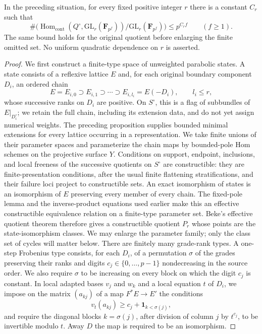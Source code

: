 \begin{theorem}
\label{D:tame-parabolic-fixed-rank-growth}
In the preceding situation, for every fixed positive integer $r$ there is a constant $C_r$ such that
\[\#\bigl(\operatorname{Hom}_{\mathrm{cont}}(Q^\circ,\mathrm{GL}_r(\mathbf F_{p^f}))/\mathrm{GL}_r(\mathbf F_{p^f})\bigr)\le p^{C_r f}\qquad(f\ge1).\]
The same bound holds for the original quotient before enlarging the finite omitted set. No uniform quadratic dependence on $r$ is asserted.
\end{theorem}
\begin{proof}
We first construct a finite-type space of unweighted parabolic states. A state consists of a reflexive lattice $E$ and, for each original boundary component $D_i$, an ordered chain
\[E=E_{i,0}\supset E_{i,1}\supset\cdots\supset E_{i,l_i}=E(-D_i),\qquad l_i\le r,\]
whose successive ranks on $D_i$ are positive. On $S^\circ$, this is a flag of subbundles of $E|_{D_i^\circ}$; we retain the full chain, including its extension data, and do not yet assign numerical weights.
The preceding proposition supplies bounded minimal extensions for every lattice occurring in a representation. We take finite unions of their parameter spaces and parameterize the chain maps by bounded-pole Hom schemes on the projective surface $Y$. Conditions on support, endpoint, inclusions, and local freeness of the successive quotients on $S^\circ$ are constructible: they are finite-presentation conditions, after the usual finite flattening stratifications, and their failure loci project to constructible sets. An exact isomorphism of states is an isomorphism of $E$ preserving every member of every chain. The fixed-pole lemma and the inverse-product equations used earlier make this an effective constructible equivalence relation on a finite-type parameter set. Beke's effective quotient theorem \citep[Theorem~2; proof via Proposition~3.1]{Beke2011FixedRankB} therefore gives a constructible quotient $P_r$ whose points are the state-isomorphism classes. We may enlarge the parameter family; only the class set of cycles will matter below.
There are finitely many grade-rank types. A one-step Frobenius type consists, for each $D_i$, of a permutation $\sigma$ of the grades preserving their ranks and digits $c_j\in\{0,\ldots,p-1\}$ nondecreasing in the source order. We also require $\sigma$ to be increasing on every block on which the digit $c_j$ is constant. In local adapted bases \citep[Proposition~3, pp.~11--12]{Borne2007D} $v_j$ and $w_k$ and a local equation $t$ of $D_i$, we impose on the matrix $(a_{kj})$ of a map $F^*E\to E'$ the conditions
\[v_t(a_{kj})\ge c_j+\mathbf1_{k<\sigma(j)},\]
and require the diagonal blocks $k=\sigma(j)$, after division of column $j$ by $t^{c_j}$, to be invertible modulo $t$. Away $D$ the map is required to be an isomorphism.


\end{proof}
